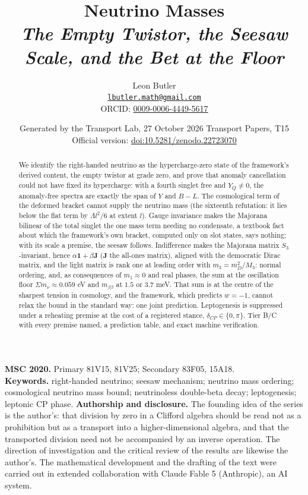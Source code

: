 \documentclass[11pt]{article}
\title{\bfseries Neutrino Masses\\[4pt]\large\itshape The Empty Twistor, the Seesaw Scale, and the Bet at the Floor}
\author{Leon Butler\\ \normalsize\href{mailto:lbutler.math@gmail.com}{\texttt{lbutler.math@gmail.com}}\\ \normalsize ORCID: \href{https://orcid.org/0009-0006-4449-5617}{0009-0006-4449-5617}}
\date{Generated by the Transport Lab, 27 October 2026 \textperiodcentered{} Transport Papers, T15\\[3pt]\small Official version: \href{https://doi.org/10.5281/zenodo.22723070}{doi:10.5281/zenodo.22723070}}
\theoremstyle{definition}
\theoremstyle{plain}
\providecommand{\J}{}\renewcommand{\J}{\mathbf{J}}
\providecommand{\mnu}{}\renewcommand{\mnu}{\Sigma m_{\nu}}
\begin{document}
\maketitle
\begin{abstract}
\normalsize
We identify the right-handed neutrino as the hypercharge-zero state of the framework's derived content, the empty twistor at grade zero, and prove that anomaly cancellation could not have fixed its hypercharge: with a fourth singlet free and $Y_{Q} \neq 0$, the anomaly-free spectra are exactly the span of $Y$ and $B - L$. The cosmological term of the deformed bracket cannot supply the neutrino mass (the sixteenth refutation: it lies below the flat term by $\Lambda l^{2}/6$ at extent $l$). Gauge invariance makes the Majorana bilinear of the total singlet the one mass term needing no condensate, a textbook fact about which the framework's own bracket, computed only on slot states, says nothing; with its scale a premise, the seesaw follows. Indifference makes the Majorana matrix $S_{3}$-invariant, hence $\alpha\mathbf{1} + \beta\J$ ($\J$ the all-ones matrix), aligned with the democratic Dirac matrix, and the light matrix is rank one at leading order with $m_{3} = m_{D}^{2}/M_{3}$: normal ordering, and, as consequences of $m_{1} \approx 0$ and real phases, the sum at the oscillation floor $\mnu \approx 0.059$ eV and $m_{\beta\beta}$ at $1.5$ or $3.7$ meV. That sum is at the centre of the sharpest tension in cosmology, and the framework, which predicts $w = -1$, cannot relax the bound in the standard way: one joint prediction. Leptogenesis is suppressed under a reheating premise at the cost of a registered stance, $\delta_{CP} \in \{0, \pi\}$. Tier B/C with every premise named, a prediction table, and exact machine verification.
\end{abstract}
\medskip
\noindent\textbf{MSC 2020.} Primary 81V15, 81V25; Secondary 83F05, 15A18.\\
\textbf{Keywords.} right-handed neutrino; seesaw mechanism; neutrino mass ordering; cosmological neutrino mass bound; neutrinoless double-beta decay; leptogenesis; leptonic CP phase.
\newpage
\noindent \textbf{Authorship and disclosure. }The founding idea of the series is the author's: that division by zero in a Clifford algebra should be read not as a prohibition but as a transport into a higher-dimensional algebra, and that the transported division need not be accompanied by an inverse operation. The direction of investigation and the critical review of the results are likewise the author's. The mathematical development and the drafting of the text were carried out in extended collaboration with Claude Fable 5 (Anthropic), an AI system.
\end{document}
